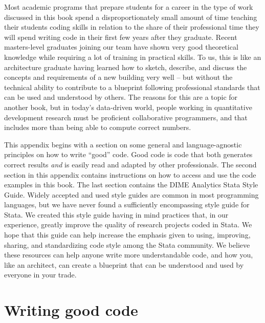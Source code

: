 
\begin{fullwidth}

Most academic programs that prepare students for a career
in the type of work discussed in this book
spend a disproportionately small amount of time
teaching their students coding skills
in relation to the share of their professional time
they will spend writing code
in their first few years after they graduate.
Recent masters-level graduates joining our team
have shown very good theoretical knowledge
while requiring a lot of training in practical skills.
To us, this is like an architecture graduate having learned
how to sketch, describe, and discuss
the concepts and requirements of a new building very well --
but without the technical ability
to contribute to a blueprint following professional standards
that can be used and understood by others.
The reasons for this are a topic for another book,
but in today's data-driven world,
people working in quantitative development research
must be proficient collaborative programmers,
and that includes more than being able to compute correct numbers.

This appendix begins with a section on some general and language-agnostic
principles on how to write ``good'' code.
Good code is code that both generates correct results \textit{and}
is easily read and adapted by other professionals.
The second section in this appendix contains instructions
on how to access and use the code examples in this book.
The last section contains the DIME Analytics Stata Style Guide.
Widely accepted and used style guides are common in most programming languages,
but we have never found a sufficiently encompassing style guide for Stata.
We created this style guide having in mind practices that,
in our experience, greatly improve the quality
of research projects coded in Stata.
We hope that this guide can help increase the emphasis
given to using, improving, sharing, and standardizing code style
among the Stata community.
We believe these resources can help anyone write more understandable code,
and how you, like an architect,
can create a blueprint that can be understood and used
by everyone in your trade.

\end{fullwidth}


\section{Writing good code}

